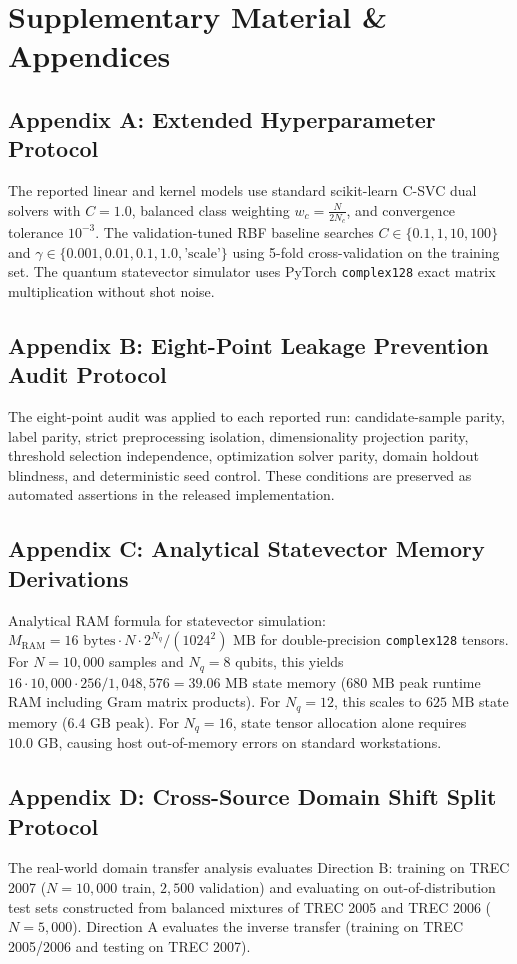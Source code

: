 \documentclass{article}
\begin{document}
\appendix
\section*{Supplementary Material \& Appendices}

\subsection*{Appendix A: Extended Hyperparameter Protocol}
The reported linear and kernel models use standard scikit-learn C-SVC dual solvers with $C=1.0$, balanced class weighting $w_c = \frac{N}{2 N_c}$, and convergence tolerance $10^{-3}$. The validation-tuned RBF baseline searches $C \in \{0.1, 1, 10, 100\}$ and $\gamma \in \{0.001, 0.01, 0.1, 1.0, \text{'scale'}\}$ using 5-fold cross-validation on the training set. The quantum statevector simulator uses PyTorch \texttt{complex128} exact matrix multiplication without shot noise.

\subsection*{Appendix B: Eight-Point Leakage Prevention Audit Protocol}
The eight-point audit was applied to each reported run: candidate-sample parity, label parity, strict preprocessing isolation, dimensionality projection parity, threshold selection independence, optimization solver parity, domain holdout blindness, and deterministic seed control. These conditions are preserved as automated assertions in the released implementation.

\subsection*{Appendix C: Analytical Statevector Memory Derivations}
Analytical RAM formula for statevector simulation: $M_{\text{RAM}} = 16 \text{ bytes} \cdot N \cdot 2^{N_q} / (1024^2)\text{ MB}$ for double-precision \texttt{complex128} tensors. For $N=10,000$ samples and $N_q=8$ qubits, this yields $16 \cdot 10,000 \cdot 256 / 1,048,576 = 39.06\text{ MB}$ state memory ($680\text{ MB}$ peak runtime RAM including Gram matrix products). For $N_q=12$, this scales to $625\text{ MB}$ state memory ($6.4\text{ GB}$ peak). For $N_q=16$, state tensor allocation alone requires $10.0\text{ GB}$, causing host out-of-memory errors on standard workstations.

\subsection*{Appendix D: Cross-Source Domain Shift Split Protocol}
The real-world domain transfer analysis evaluates Direction B: training on TREC 2007 ($N=10,000$ train, $2,500$ validation) and evaluating on out-of-distribution test sets constructed from balanced mixtures of TREC 2005 and TREC 2006 ($N=5,000$). Direction A evaluates the inverse transfer (training on TREC 2005/2006 and testing on TREC 2007).
\end{document}
